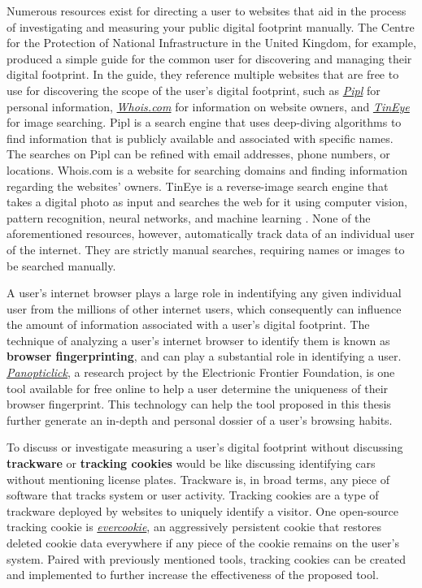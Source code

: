 \documentclass[11pt]{article}
\begin{document}
Numerous resources exist for directing a user to websites that aid in the process of investigating and measuring your public digital footprint manually. The Centre for the Protection of National Infrastructure in the United Kingdom, for example, produced a simple guide for the common user for discovering and managing their digital footprint\cite{cpni-df}. In the guide, they reference multiple websites that are free to use for discovering the scope of the user's digital footprint, such as \href{http://www.pipl.com}{\it Pipl} for personal information, \href{http://www.whois.com}{\it Whois.com} for information on website owners, and \href{http://www.tineye.com}{\it TinEye} for image searching. Pipl is a search engine that uses deep-diving algorithms to find information that is publicly available and associated with specific names. The searches on Pipl can be refined with email addresses, phone numbers, or locations. Whois.com is a website for searching domains and finding information regarding the websites' owners. TinEye is a reverse-image search engine that takes a digital photo as input and searches the web for it using computer vision, pattern recognition, neural networks, and machine learning \cite{tineye}. None of the aforementioned resources, however, automatically track data of an individual user of the internet. They are strictly manual searches, requiring names or images to be searched manually.

A user's internet browser plays a large role in indentifying any given individual user from the millions of other internet users, which consequently can influence the amount of information associated with a user's digital footprint. The technique of analyzing a user's internet browser to identify them is known as {\bf browser fingerprinting}, and can play a substantial role in identifying a user. {\it \href{https://panopticlick.eff.org/}{Panopticlick}}, a research project by the Electrionic Frontier Foundation, is one tool available for free online to help a user determine the uniqueness of their browser fingerprint\cite{panopticlick}. This technology can help the tool proposed in this thesis further generate an in-depth and personal dossier of a user's browsing habits.

To discuss or investigate measuring a user's digital footprint without discussing {\bf trackware} or {\bf tracking cookies} would be like discussing identifying cars without mentioning license plates. Trackware is, in broad terms, any piece of software that tracks system or user activity. Tracking cookies are a type of trackware deployed by websites to uniquely identify a visitor. One open-source tracking cookie is \href{https://samy.pl/evercookie/}{\it evercookie}, an aggressively persistent cookie that restores deleted cookie data everywhere if any piece of the cookie remains on the user's system\cite{evercookie}. Paired with previously mentioned tools, tracking cookies can be created and implemented to further increase the effectiveness of the proposed tool.
\end{document}
